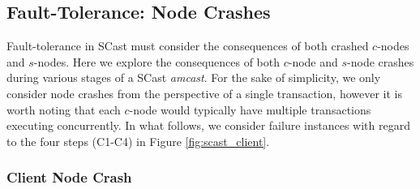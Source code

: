 	\subsection{Fault-Tolerance: Node Crashes}\label{ssec:scast_fault_tolerance}
	Fault-tolerance in \textsf{SCast} must consider the consequences of both crashed $c$-nodes and $s$-nodes.  Here we explore the consequences of both $c$-node and $s$-node crashes during various stages of a \textsf{SCast} \emph{amcast}.  For the sake of simplicity, we only consider node crashes from the perspective of a single transaction, however it is worth noting that each $c$-node would typically have multiple transactions executing concurrently.  In what follows, we consider failure instances with regard to the four steps (C1-C4) in Figure \ref{fig:scast_client}.  
	
    \subsubsection*{Client Node Crash}
